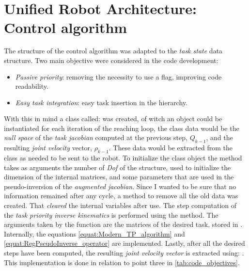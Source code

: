 \section{Unified Robot Architecture: Control algorithm}
The structure of the control algorithm was adapted to the \textit{task state} data structure. Two main objective were considered in the code development:
\begin{itemize}
	\item \textit{Passive priority}: removing the necessity to use a flag, improving code readability.
	\item \textit{Easy task integration}: easy task insertion in the hierarchy.
\end{itemize}
\noindent With this in mind a class called:  was created, of witch an object could be instantiated for each iteration of the reaching loop, the class data would be the \textit{null space} of the \textit{task jacobian} computed at the previous step, $Q_{k-1}$, and the resulting \textit{joint velocity} vector, $\rho_{k-1}$. These data would be extracted from the class as needed to be sent to the robot. To initialize the class object the method  takes as arguments the number of \textit{Dof} of the structure, used to initialize the dimension of the internal matrices, and some parameters that are used in the pseudo-inversion of the \textit{augmented jacobian}.
Since I wanted to be sure that no information remained after any cycle, a method to remove all the old data was created. That \textit{cleared} the internal variables after use. The step computation of the \textit{task priority inverse kinematics} is performed using the   method. The arguments taken by the function are the matrices of the desired task, stored in  . Internally, the equations \ref{equat:Modern_TP_algorithm} and \ref{equat:RegPseudoInverse_operator} are implemented. Lastly, after all the desired steps have been computed, the resulting \textit{joint velocity vector} is extracted using: .
\noindent This implementation is done in relation to point three in \ref{tab:code_objectives}.


